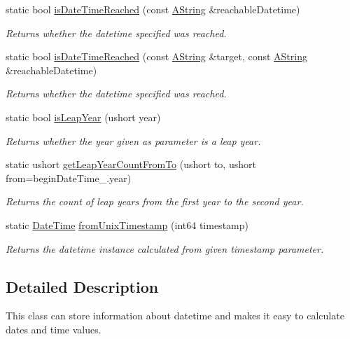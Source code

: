 \begin{DoxyCompactItemize}
static bool \mbox{\hyperlink{class_date_time_aa9793671179a12cd08dc371a2668a321}{is\+Date\+Time\+Reached}} (const \mbox{\hyperlink{class_a_string}{A\+String}} \&reachable\+Datetime)
\begin{DoxyCompactList}\small\item\em Returns whether the datetime specified was reached. \end{DoxyCompactList}\item 
static bool \mbox{\hyperlink{class_date_time_a5098104322ff5c66131299c5a8659999}{is\+Date\+Time\+Reached}} (const \mbox{\hyperlink{class_a_string}{A\+String}} \&target, const \mbox{\hyperlink{class_a_string}{A\+String}} \&reachable\+Datetime)
\begin{DoxyCompactList}\small\item\em Returns whether the datetime specified was reached. \end{DoxyCompactList}\item 
static bool \mbox{\hyperlink{class_date_time_afd597cb69bb422b066bac46c96cc5f12}{is\+Leap\+Year}} (ushort year)
\begin{DoxyCompactList}\small\item\em Returns whether the year given as parameter is a leap year. \end{DoxyCompactList}\item 
static ushort \mbox{\hyperlink{class_date_time_a8401d6a8ad1aec862f2a96bb9eda1870}{get\+Leap\+Year\+Count\+From\+To}} (ushort to, ushort from=begin\+Date\+Time\+\_\+.\+year)
\begin{DoxyCompactList}\small\item\em Returns the count of leap years from the first year to the second year. \end{DoxyCompactList}\item 
static \mbox{\hyperlink{class_date_time}{Date\+Time}} \mbox{\hyperlink{class_date_time_afdc41a37a33bc6c5643430494f959c1b}{from\+Unix\+Timestamp}} (int64 timestamp)
\begin{DoxyCompactList}\small\item\em Returns the datetime instance calculated from given timestamp parameter. \end{DoxyCompactList}\end{DoxyCompactItemize}


\subsection{Detailed Description}
This class can store information about datetime and makes it easy to calculate dates and time values. 

